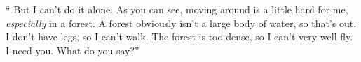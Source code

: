 \documentclass{article}
\begin{document}
\enquote{%
  But I can't do it alone.
  As you can see, moving around is a little hard for me, \emph{especially} in a forest.
  A forest obviously isn't a large body of water, so that's out.
  I don't have legs, so I can't walk.
  The forest is too dense, so I can't very well fly.
  I need you.
  What do you say?}


\vfill


\vfill
\end{document}
